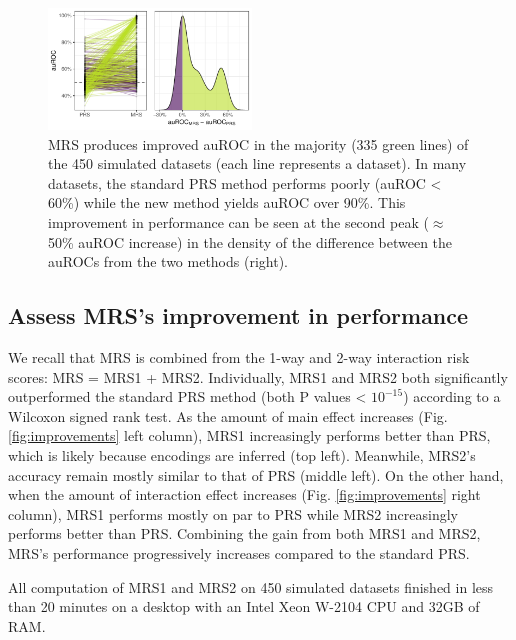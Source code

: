 \documentclass[a4paper,twoside, 9pt]{article}
\begin{document}
\begin{figure}
\centering
\includegraphics[width=0.48\textwidth]{images/1_ori_vs_MRS_auROC_.pdf}
\caption{MRS produces improved auROC in the majority (335 green lines)
of the 450 simulated datasets (each line represents a dataset). In many
datasets, the standard PRS method performs poorly (auROC \textless{}
60\%) while the new method yields auROC over 90\%. This improvement in
performance can be seen at the second peak ($\approx$ 50\% auROC
increase) in the density of the difference between the auROCs from the
two methods (right).}
\label{fig:auroc_mrs_prs}
\end{figure}

\hypertarget{assess-improvement-in-performance}{%
\subsection{Assess MRS's improvement in
performance}\label{assess-improvement-in-performance}}

\noindent We recall that MRS is combined from the 1-way and 2-way interaction risk scores: MRS = MRS1 + MRS2.
Individually, MRS1 and MRS2 both significantly outperformed the standard
PRS method (both P values \textless{} \(10^{-15}\)) according to a
Wilcoxon signed rank test. As the amount of main effect increases (Fig.
\ref{fig:improvements} left column), MRS1 increasingly performs better
than PRS, which is likely because encodings are inferred (top left).
Meanwhile, MRS2's accuracy remain mostly similar to that of PRS (middle
left). On the other hand, when the amount of interaction effect
increases (Fig. \ref{fig:improvements} right column), MRS1 performs
mostly on par to PRS while MRS2 increasingly performs better than PRS.
Combining the gain from both MRS1 and MRS2, MRS's performance
progressively increases compared to the standard PRS.

All computation of MRS1 and MRS2 on 450 simulated datasets finished in less than 20 minutes on a desktop with an Intel Xeon W-2104 CPU and 32GB of RAM.
\end{document}
